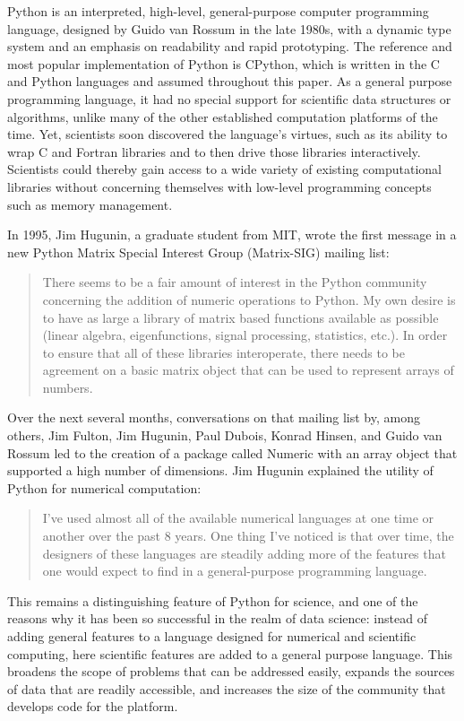 \documentclass[fleqn,10pt]{wlscirep}
\begin{document}
Python is an interpreted, high-level, general-purpose computer programming
language, designed by Guido van Rossum in the late 1980s,
with a dynamic type system and an emphasis on readability and rapid prototyping.
The reference and most popular implementation of Python is
CPython\cite{cpython-refman,cpython-source}, which is written
in the C and Python languages and assumed throughout this paper.
%
As a general purpose programming language, it had no special support for
scientific data structures or algorithms, unlike many of the other established
computation platforms of the time. Yet, scientists soon discovered the
language's virtues, such as its ability to wrap C and Fortran
libraries and to then drive those libraries interactively.  Scientists
could thereby gain access to a wide variety of existing computational
libraries without concerning themselves with low-level programming
concepts such as memory management.

In 1995, Jim Hugunin, a graduate student from MIT, wrote the first
message in a new Python Matrix Special Interest Group (Matrix-SIG)
mailing list\cite{Hugunin-first}:
\begin{quote}
There seems to be a fair amount of interest in the Python community
concerning the addition of numeric operations to Python.  My own desire is
to have as large a library of matrix based functions available as possible
(linear algebra, eigenfunctions, signal processing, statistics, etc.).  In
order to ensure that all of these libraries interoperate, there needs to
be agreement on a basic matrix object that can be used to represent arrays
of numbers.
\end{quote}
Over the next several months, conversations on that mailing
list by, among others, Jim Fulton, Jim Hugunin, Paul Dubois, Konrad
Hinsen, and Guido van Rossum led to the creation of a package called Numeric with an array object
that supported a high number of dimensions.  Jim Hugunin explained the utility
of Python for numerical computation\cite{Hugunin-whitepaper}:
\begin{quote}
I've used almost all of the available numerical languages at one time
or another over the past 8 years. One thing I've noticed is that over
time, the designers of these languages are steadily adding more of the
features that one would expect to find in a general-purpose
programming language.
\end{quote}
This remains a distinguishing feature of Python for science, and one of the
reasons why it has been so successful in the realm of data science: instead of
adding general features to a language designed for numerical and scientific
computing, here scientific features are added to a general purpose language.
This broadens the scope of problems that can be addressed easily, expands the
sources of data that are readily accessible, and increases the size of the
community that develops code for the platform.
\end{document}
